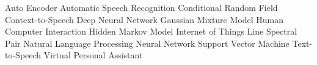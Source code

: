 


  {Auto Encoder}
 {Automatic Speech Recognition}
 {Conditional Random Field}
 {Context-to-Speech}
 {Deep Neural Network}
 {Gaussian Mixture Model}
 {Human Computer Interaction}
 {Hidden Markov Model}
 {Internet of Things}
 {Line Spectral Pair}
 {Natural Language Processing}
  {Neural Network}
 {Support Vector Machine}
 {Text-to-Speech}
 {Virtual Personal Assistant}



